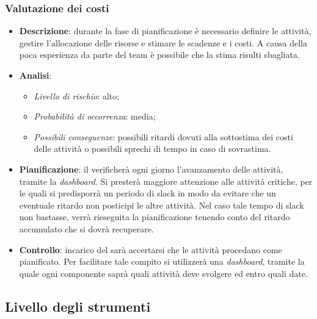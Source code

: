 		\subsubsection{Valutazione dei costi}
			\begin{itemize}
				\item \textbf{Descrizione}: durante la fase di pianificazione è necessario definire le attività, gestire l'allocazione delle risorse e stimare le scadenze e i costi. A causa della poca esperienza da parte del team è possibile che la stima risulti sbagliata.
				\item \textbf{Analisi}:
				\begin{itemize}
					\item \textit{Livello di rischio}: alto;
					\item \textit{Probabilità di occorrenza}: media;
					\item \textit{Possibili conseguenze}: possibili ritardi dovuti alla sottostima dei costi delle attività o possibili sprechi di tempo in caso di sovrastima. 
				\end{itemize}
				\item \textbf{Pianificazione}: il  verificherà ogni giorno l'avanzamento delle attività, tramite la \textit{dashboard}. Si presterà maggiore attenzione alle attività critiche, per le quali si predisporrà un periodo di slack in modo da evitare che un eventuale ritardo non posticipi le altre attività. Nel caso tale tempo di slack non bastasse, verrà rieseguita la pianificazione tenendo conto del ritardo accumulato che si dovrà recuperare.
				\item \textbf{Controllo}: incarico del  sarà accertarsi che le attività procedano come pianificato. Per facilitare tale compito si utilizzerà una \textit{dashboard}, tramite la quale ogni componente saprà quali attività deve svolgere ed entro quali date.
			\end{itemize}
	\subsection{Livello degli strumenti}
